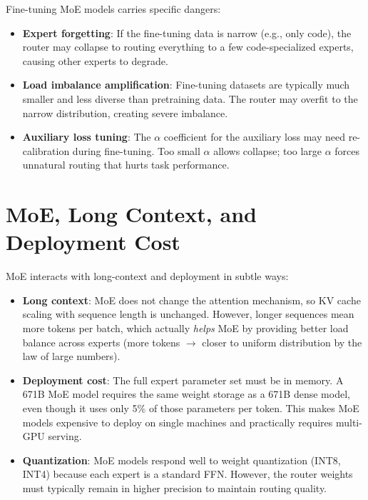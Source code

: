 Fine-tuning MoE models carries specific dangers:
\begin{itemize}
  \item \textbf{Expert forgetting}: If the fine-tuning data is narrow (e.g., only code), the router may collapse to routing everything to a few code-specialized experts, causing other experts to degrade.
  \item \textbf{Load imbalance amplification}: Fine-tuning datasets are typically much smaller and less diverse than pretraining data. The router may overfit to the narrow distribution, creating severe imbalance.
  \item \textbf{Auxiliary loss tuning}: The $\alpha$ coefficient for the auxiliary loss may need re-calibration during fine-tuning. Too small $\alpha$ allows collapse; too large $\alpha$ forces unnatural routing that hurts task performance.
\end{itemize}

\section{MoE, Long Context, and Deployment Cost}
\label{ch:13:sec:deployment}

MoE interacts with long-context and deployment in subtle ways:
\begin{itemize}
  \item \textbf{Long context}: MoE does not change the attention mechanism, so KV cache scaling with sequence length is unchanged. However, longer sequences mean more tokens per batch, which actually \emph{helps} MoE by providing better load balance across experts (more tokens $\to$ closer to uniform distribution by the law of large numbers).
  \item \textbf{Deployment cost}: The full expert parameter set must be in memory. A 671B MoE model requires the same weight storage as a 671B dense model, even though it uses only 5\% of those parameters per token. This makes MoE models expensive to deploy on single machines and practically requires multi-GPU serving.
  \item \textbf{Quantization}: MoE models respond well to weight quantization (INT8, INT4) because each expert is a standard FFN. However, the router weights must typically remain in higher precision to maintain routing quality.
\end{itemize}

